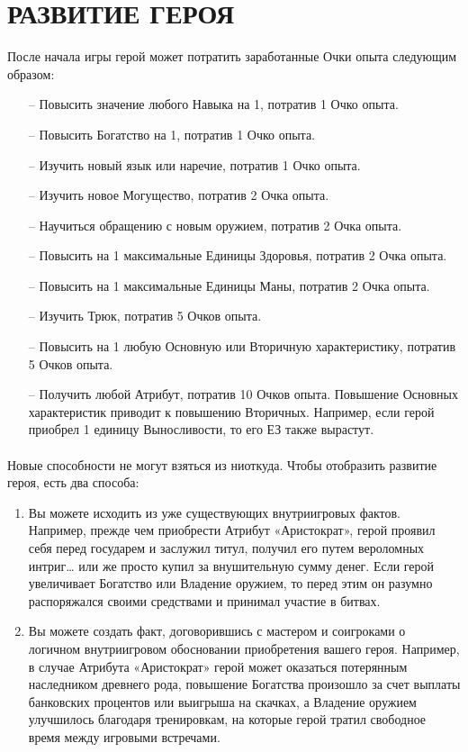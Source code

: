 \section{РАЗВИТИЕ ГЕРОЯ}
После начала игры герой может потратить заработанные Очки опыта следующим образом:
\begin{itemize}
\item[--] Повысить значение любого Навыка на 1, потратив 1 Очко опыта.
\item[--] Повысить Богатство на 1, потратив 1 Очко опыта.
\item[--] Изучить новый язык или наречие, потратив 1 Очко опыта.
\item[--] Изучить новое Могущество, потратив 2 Очка опыта.
\item[--] Научиться обращению с новым оружием, потратив 2 Очка опыта.
\item[--] Повысить на 1 максимальные Единицы Здоровья, потратив 2 Очка опыта.
\item[--] Повысить на 1 максимальные Единицы Маны, потратив 2 Очка опыта.
\item[--] Изучить Трюк, потратив 5 Очков опыта.
\item[--] Повысить на 1 любую Основную или Вторичную характеристику, потратив 5 Очков опыта.
\item[--] Получить любой Атрибут, потратив 10 Очков опыта.
Повышение Основных характеристик приводит к повышению
Вторичных. Например, если герой приобрел 1 единицу Выносливости, то его ЕЗ также вырастут.
\end{itemize}
\paragraph{}
Новые способности не могут взяться из ниоткуда. Чтобы отобразить развитие героя, есть два способа:
\begin{enumerate}
\item Вы можете исходить из уже существующих внутриигровых фактов. Например, прежде чем приобрести Атрибут «Аристократ», герой проявил себя перед государем и заслужил титул, получил его путем вероломных интриг… или же просто купил за внушительную сумму денег. Если герой увеличивает Богатство или Владение оружием, то перед этим он разумно распоряжался своими средствами и принимал участие в битвах.
\item Вы можете создать факт, договорившись с мастером и соигроками о логичном внутриигровом обосновании приобретения вашего героя. Например, в случае Атрибута «Аристократ» герой может оказаться потерянным наследником древнего рода, повышение Богатства произошло за счет выплаты банковских процентов или выигрыша на скачках, а Владение оружием улучшилось благодаря тренировкам, на которые герой тратил свободное время между игровыми встречами.
\end{enumerate}